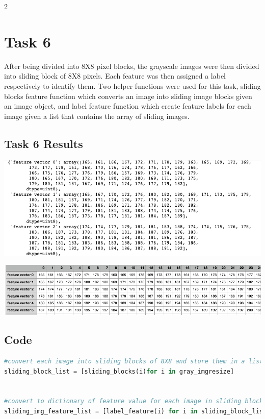 \documentclass{article}
\begin{document}
\begin{multicols}{2}
	\section{Task 6}
	After being divided into 8X8 pixel blocks, the grayscale images were then divided into sliding block of 8X8 pixels. Each feature was then assigned a label respectively to identify them. Two helper functions were used for this task, sliding blocks feature function which converts an image into sliding image blocks given an image object, and label feature function which create feature labels for each image given a list that contains the array of sliding images.  
	
	\subsection{Task 6 Results}
	\centering
		\includegraphics[scale=0.2]{../screenshots/sliding88.png}
	
	\centering
		\includegraphics[scale=0.25]{../screenshots/sliding88csv.png}
\end{multicols}

\pagebreak
\subsection{Code}
\begin{lstlisting}[language=Python]
#convert each image into sliding blocks of 8X8 and store them in a list each index of list contains all blocks of each image 
sliding_block_list = [sliding_blocks(i)for i in gray_imgresize]


#convert to dictionary of feature value for each image in sliding block and store all image in a list
sliding_img_feature_list = [label_feature(i) for i in sliding_block_list]
\end{lstlisting}
\end{document}
